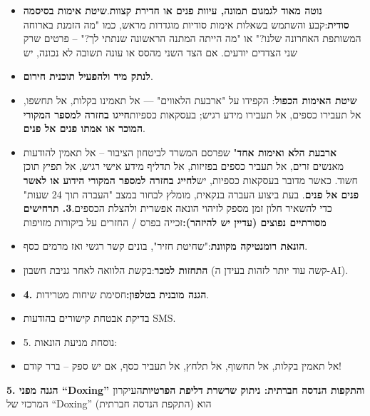 \begin{itemize}
  \item \textbf{נוטה מאוד לגמגום תמונה, עיוות פנים או חדירת קצוות}.\textbf{שיטת אימות בסיסמה סודית}:קבע והשתמש בשאלות אימות סודיות מוגדרות מראש, כמו "מה הזמנת בארוחה המשותפת האחרונה שלנו?" או "מה הייתה המתנה הראשונה שנתתי לך?" – פרטים שרק שני הצדדים יודעים. אם הצד השני מהסס או עונה תשובה לא נכונה, יש
  \item \textbf{לנתק מיד ולהפעיל תוכנית חירום}.
  \item \textbf{שיטת האימות הכפול}: הקפידו על "ארבעת הלאווים" — אל תאמינו בקלות, אל תחשפו, אל תעבירו כספים, אל תעבירו מידע רגיש; בעסקאות כספיות\textbf{חייגו בחזרה למספר המקורי המוכר או אמתו פנים אל פנים}.
  \item \textbf{ארבעת הלא ואימות אחד}" שפרסם המשרד לביטחון הציבור – אל תאמין להודעות מאנשים זרים, אל תעביר כספים בפזיזות, אל תדליף מידע אישי רגיש, אל תפיץ תוכן חשוד. כאשר מדובר בעסקאות כספיות, יש\textbf{לחייג בחזרה למספר המקורי הידוע או לאשר פנים אל פנים}. בעת ביצוע העברה בנקאית, מומלץ לבחור במצב "העברה תוך 24 שעות" כדי להשאיר חלון זמן מספק לזיהוי הונאה אפשרית ולהצלת הכספים.\textbf{3. תרחישים מסורתיים נפוצים (עדיין יש להיזהר):}זכייה בפרס / החזרים על ביקורות מזויפות
\end{itemize}


\begin{itemize}
  \item \textbf{הונאת רומנטיקה מקוונת}:"שחיטת חזיר", בונים קשר רגשי ואז מרמים כסף.
  \item \textbf{התחזות למכר}:בקשת הלוואה לאחר גניבת חשבון (קשה עוד יותר לזהות בעידן ה-AI).
  \item \textbf{4. הגנה מובנית בטלפון:}חסימת שיחות מטרידות.
\end{itemize}


\begin{itemize}
  \item בדיקת אבטחת קישורים בהודעות SMS.
  \item 5. נוסחת מניעת הונאות:
  \item אל תאמין בקלות, אל תחשוף, אל תלחץ, אל תעביר כסף, אם יש ספק – ברר קודם!
\end{itemize}


\textbf{5. הגנה מפני “Doxing” והתקפות הנדסה חברתית: ניתוק שרשרת דליפת הפרטיות}העיקרון המרכזי של “Doxing” (התקפת הנדסה חברתית) הוא

